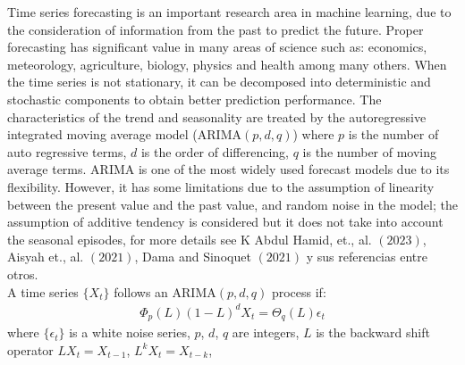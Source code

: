 Time series forecasting is an important research area in machine learning, due to the 
consideration of information from the past to predict the future.
Proper forecasting has significant value in
many areas of science such as: economics, meteorology, agriculture, biology,
 physics and health among many others.
 When the time series is not stationary, it can be decomposed into 
 deterministic and stochastic components to obtain better prediction performance.
The characteristics of the trend and seasonality are treated
by the autoregressive integrated moving average model (ARIMA$(p,d,q)$)
where $p$ is the number of auto regressive terms, $d$ is the
order of differencing, $q$ is the number of moving average terms.
ARIMA is one of the most widely used forecast models due to its flexibility. 
However, it has some limitations due to the assumption of linearity between 
the present value and the past value, and random noise in the model; 
the assumption of additive tendency is considered but it does not take
 into account the seasonal episodes, for more details see
K Abdul Hamid,  et., al. $(2023)$, Aisyah et., al. $(2021)$, 
Dama and Sinoquet $(2021)$ 
y sus referencias entre otros.\\
A time series $\{X_{t}\}$ follows an ARIMA$(p,d,q)$ process if:
\begin{align*}
 \Phi_{p}(L)\left(1-L\right)^{d}X_{t}= \Theta_{q}(L)\epsilon_{t}
\end{align*}
where $\{\epsilon_{t}\}$ is a white noise series, $p$, $d$, $q$ are integers,
 $L$ is the backward shift operator $LX_{t}= X_{t-1}$, $L^{k}X_{t}= X_{t-k}$,
